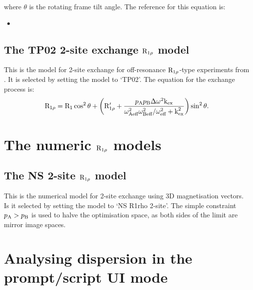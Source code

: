 where $\theta$ is the rotating frame tilt angle.  The reference for this equation is:
\begin{itemize}
\item {}
\end{itemize}



\subsection{The TP02 2-site exchange $\mathrm{R}_{1\rho}$ model}
\label{sect: dispersion: TP02 model}

This is the model for 2-site exchange for off-resonance $\mathrm{R}_{1\rho}$-type experiments from \citet{TrottPalmer02}.  It is selected by setting the model to `TP02'.  The equation for the exchange process is:
\begin{equation}
    \mathrm{R}_{1\rho} = \mathrm{R}_1\cos^2\theta + \left( \mathrm{R}_{1\rho}' + \frac{p_\textrm{A}p_\textrm{B}\Delta\omega^2\textrm{k}_\textrm{ex}}{\omega_\textrm{Aeff}^2\omega_\textrm{Beff}^2/\omega_\textrm{eff}^2 + \textrm{k}_\textrm{ex}^2} \right) \sin^2\theta.
\end{equation}




\section{The numeric $\mathrm{R}_{1\rho}$ models}
\label{sect: dispersion: numeric R1rho models}


\subsection{The NS 2-site $\mathrm{R}_{1\rho}$ model}
\label{sect: dispersion: NS R1rho 2-site model}

This is the numerical model for 2-site exchange using 3D magnetisation vectors.
Is it selected by setting the model to `NS R1rho 2-site'.
The simple constraint $p_\textrm{A} > p_\textrm{B}$ is used to halve the optimisation space, as both sides of the limit are mirror image spaces.




\section{Analysing dispersion in the prompt/script UI mode}

